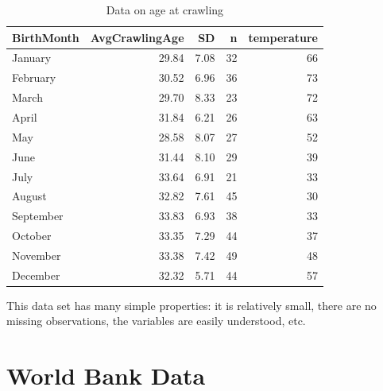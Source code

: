 \documentclass[12pt,oneside]{book}\usepackage[]{graphicx}\usepackage[]{color}
\begin{document}
\begin{table}[ht]
\centering
\begin{tabular}{lrrrr}
  \hline
BirthMonth & AvgCrawlingAge & SD & n & temperature \\ 
  \hline
January & 29.84 & 7.08 &  32 &  66 \\ 
  February & 30.52 & 6.96 &  36 &  73 \\ 
  March & 29.70 & 8.33 &  23 &  72 \\ 
  April & 31.84 & 6.21 &  26 &  63 \\ 
  May & 28.58 & 8.07 &  27 &  52 \\ 
  June & 31.44 & 8.10 &  29 &  39 \\ 
  July & 33.64 & 6.91 &  21 &  33 \\ 
  August & 32.82 & 7.61 &  45 &  30 \\ 
  September & 33.83 & 6.93 &  38 &  33 \\ 
  October & 33.35 & 7.29 &  44 &  37 \\ 
  November & 33.38 & 7.42 &  49 &  48 \\ 
  December & 32.32 & 5.71 &  44 &  57 \\ 
   \hline
\end{tabular}
\caption{Data on age at crawling} 
\label{TABLE:CRAWLING}
\end{table}

This data set has many simple properties: it is relatively small, there are no missing observations, the variables are easily understood, etc. 

\section{World Bank Data}
\end{document}
